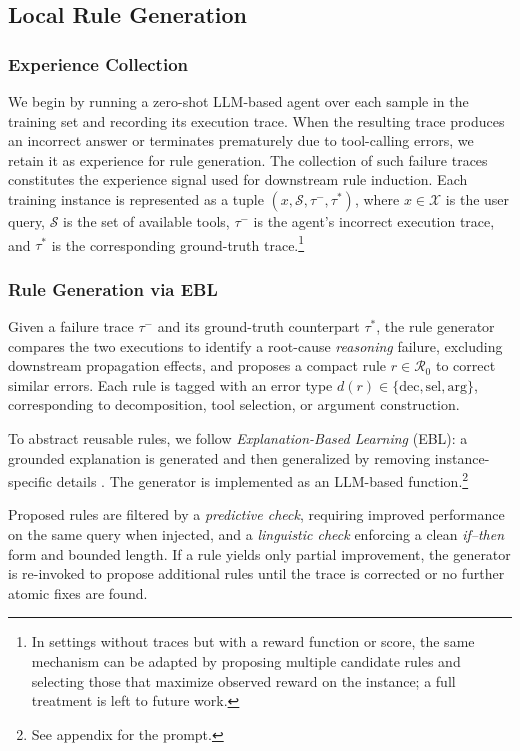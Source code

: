 \subsection{Local Rule Generation}
\label{sec:ebl}

\subsubsection{Experience Collection}

We begin by running a zero-shot LLM-based agent over each sample in the training set and
recording its execution trace. When the resulting trace produces an incorrect answer or
terminates prematurely due to tool-calling errors, we retain it as experience for rule
generation. The collection of such failure traces constitutes the experience signal used
for downstream rule induction.
Each training instance is represented as a tuple \( (x, \mathcal{S}, \tau^-, \tau^*) \),
where \( x \in \mathcal{X} \) is the user query, \( \mathcal{S} \) is the set of available
tools, \( \tau^- \) is the agent’s incorrect execution trace, and \( \tau^* \) is the
corresponding ground-truth trace.\footnote{
In settings without traces but with a reward function or score,
the same mechanism can be adapted by proposing multiple candidate rules and selecting those
that maximize observed reward on the instance; a full treatment is left to future work.}


\subsubsection{Rule Generation via EBL}

Given a failure trace \( \tau^- \) and its ground-truth counterpart \( \tau^* \), the rule
generator compares the two executions to identify a root-cause \emph{reasoning} failure,
excluding downstream propagation effects, and proposes a compact rule
\( r \in \mathcal{R}_0 \) to correct similar errors. Each rule is tagged with an error type
\( d(r) \in \{\mathrm{dec}, \mathrm{sel}, \mathrm{arg}\} \), corresponding to decomposition,
tool selection, or argument construction.

To abstract reusable rules, we follow \emph{Explanation-Based Learning} (EBL): a grounded
explanation is generated and then generalized by removing instance-specific details
\citep{mitchell1986explanation,dejong1986explanation}. The generator is implemented as an
LLM-based function.\footnote{See appendix for the prompt.}

Proposed rules are filtered by a \emph{predictive check}, requiring improved performance on
the same query when injected, and a \emph{linguistic check} enforcing a clean \emph{if--then}
form and bounded length. If a rule yields only partial improvement, the generator is
re-invoked to propose additional rules until the trace is corrected or no further atomic
fixes are found.
